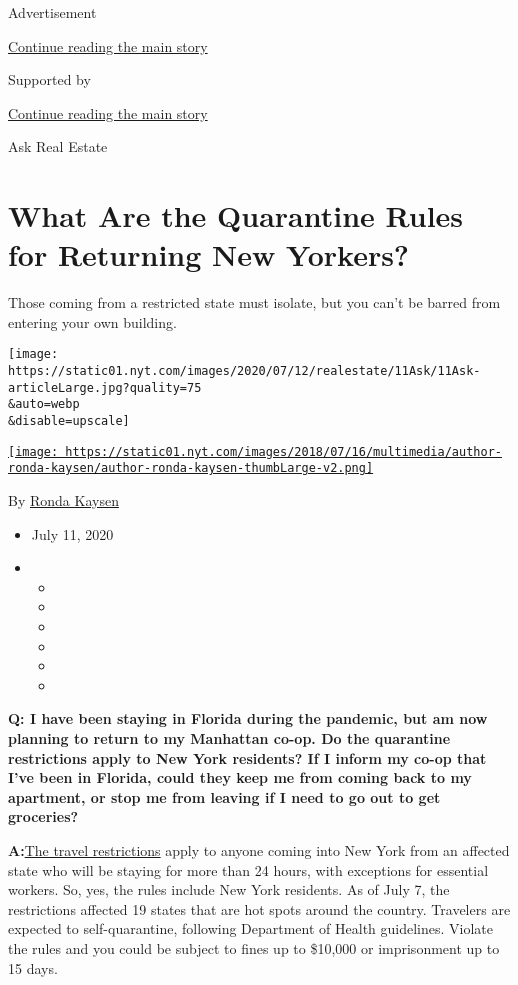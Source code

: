 Advertisement

\protect\hyperlink{after-top}{Continue reading the main story}

Supported by

\protect\hyperlink{after-sponsor}{Continue reading the main story}

Ask Real Estate

\hypertarget{what-are-the-quarantine-rules-for-returning-new-yorkers}{%
\section{What Are the Quarantine Rules for Returning New
Yorkers?}\label{what-are-the-quarantine-rules-for-returning-new-yorkers}}

Those coming from a restricted state must isolate, but you can't be
barred from entering your own building.

\texttt{[image: https://static01.nyt.com/images/2020/07/12/realestate/11Ask/11Ask-articleLarge.jpg?quality=75\\\&auto=webp\\\&disable=upscale]}

\href{https://www.nytimes.com/by/ronda-kaysen}{\texttt{[image: https://static01.nyt.com/images/2018/07/16/multimedia/author-ronda-kaysen/author-ronda-kaysen-thumbLarge-v2.png]}}

By \href{https://www.nytimes.com/by/ronda-kaysen}{Ronda Kaysen}

\begin{itemize}
\item
  July 11, 2020
\item
  \begin{itemize}
  \item
  \item
  \item
  \item
  \item
  \item
  \end{itemize}
\end{itemize}

\textbf{Q: I have been staying in Florida during the pandemic, but am
now planning to return to my Manhattan co-op. Do the quarantine
restrictions apply to New York residents? If I inform my co-op that I've
been in Florida, could they keep me from coming back to my apartment, or
stop me from leaving if I need to go out to get groceries?}

\textbf{A:}\href{https://coronavirus.health.ny.gov/covid-19-travel-advisory}{The
travel restrictions} apply to anyone coming into New York from an
affected state who will be staying for more than 24 hours, with
exceptions for essential workers. So, yes, the rules include New York
residents. As of July 7, the restrictions affected 19 states that are
hot spots around the country. Travelers are expected to self-quarantine,
following Department of Health guidelines. Violate the rules and you
could be subject to fines up to \$10,000 or imprisonment up to 15 days.

